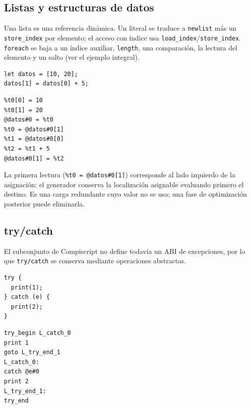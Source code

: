 \documentclass[11pt,a4paper]{article}
\begin{document}
\subsection{Listas y estructuras de datos}

Una lista es una referencia dinámica. Un literal se traduce a \texttt{newlist}
más un \texttt{store\_index} por elemento; el acceso con índice usa
\texttt{load\_index}/\texttt{store\_index}. \texttt{foreach} se baja a un índice
auxiliar, \texttt{length}, una comparación, la lectura del elemento y un salto
(ver el ejemplo integral).

\noindent
\begin{minipage}[t]{0.40\textwidth}
\begin{lstlisting}[language=Compiscript,style=sinnumero]
let datos = [10, 20];
datos[1] = datos[0] + 5;
\end{lstlisting}
\end{minipage}\hfill
\begin{minipage}[t]{0.54\textwidth}
\begin{lstlisting}[language=TAC,style=sinnumero]
%t0 = newlist 2
%t0[0] = 10
%t0[1] = 20
@datos#0 = %t0
%t0 = @datos#0[1]
%t1 = @datos#0[0]
%t2 = %t1 + 5
@datos#0[1] = %t2
\end{lstlisting}
\end{minipage}

La primera lectura (\texttt{\%t0 = @datos\#0[1]}) corresponde al lado izquierdo
de la asignación: el generador conserva la localización asignable evaluando
primero el destino. Es una carga redundante cuyo valor no se usa; una fase de
optimización posterior puede eliminarla.

\subsection{try/catch}

El subconjunto de Compiscript no define todavía un ABI de excepciones, por lo
que \texttt{try/catch} se conserva mediante operaciones abstractas.

\noindent
\begin{minipage}[t]{0.34\textwidth}
\begin{lstlisting}[language=Compiscript,style=sinnumero]
try {
  print(1);
} catch (e) {
  print(2);
}
\end{lstlisting}
\end{minipage}\hfill
\begin{minipage}[t]{0.60\textwidth}
\begin{lstlisting}[language=TAC,style=sinnumero]
try_begin L_catch_0
print 1
goto L_try_end_1
L_catch_0:
catch @e#0
print 2
L_try_end_1:
try_end
\end{lstlisting}
\end{minipage}
\end{document}
